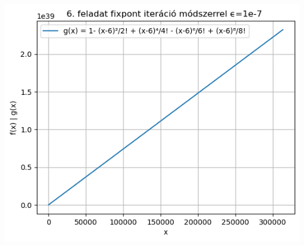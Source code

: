 \documentclass{article}
\begin{document}
\includegraphics[scale=1]{../plot_8.png}  
 
\end{document}
